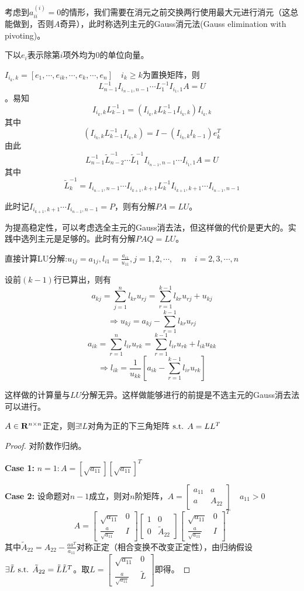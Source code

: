 \documentclass{ctexart}
\begin{document}
考虑到$a_{ii}^{(i)}=0$的情形，我们需要在消元之前交换两行使用最大元进行消元（这总能做到，否则$A$奇异），此时称选列主元的Gauss消元法(Gauss elimination with pivoting)。

下以$e_i$表示除第$i$项外均为0的单位向量。

$I_{i_k,k}=[e_1,\cdots, e_{ik},\cdots ,e_k,\cdots, e_n]\quad i_k\geq k$为置换矩阵，则\[L_{n-1}^{-1}I_{i_{n-1},n-1}\cdots L_1^{-1}I_{i_1,1}A=U\]。易知\[I_{i_k,k}L^{-1}_{k-1}=(I_{i_k,k}L_{k-1}^{-1}I_{i_k,k})I_{i_k,k}\]其中\[(I_{i_k,k}L_{k-1}^{-1}I_{i_k,k})=I-(I_{i_k,k}l_{k-1})e_k^T\]由此\[L^{-1}_{n-1}\tilde{L}^{-1}_{n-2}\cdots \tilde{L}^{-1}_1I_{i_{n-1},n-1}\cdots I_{i_1,1}A=U\]其中\[\tilde{L}^{-1}_{k}=I_{i_{n-1},n-1}\cdots I_{i_{k+1},k+1}L_k^{-1} I_{i_{k+1},k+1}\cdots I_{i_{n-1},n-1}\]

此时记$I_{i_{k+1},k+1}\cdots I_{i_{n-1},n-1}=P$，则有分解$PA=LU$。

为提高稳定性，可以考虑选全主元的Gauss消去法，但这样做的代价是更大的。实践中选列主元是足够的。此时有分解$PAQ=LU$。

直接计算LU分解:$u_{1j}=a_{1j},l_{i1}=\frac{a_{i1}}{u_{11}},j=1,2,\cdots,\quad n\quad i=2,3,\cdots,n$

设前$(k-1)$行已算出，则有
\[a_{kj}=\sum_{j=1}^n l_{kr}u_{rj}=\sum_{r=1}^{k-1}l_{kr}u_{rj}+u_{kj}\]
\[\Rightarrow u_{kj}=a_{kj}-\sum_{r=1}^{k-1}l_{kr}u_{rj}\]
\[a_{ik}=\sum_{r=1}^n l_{ir}u_{rk}=\sum_{r=1}^{k-1}l_{ir}u_{rk}+l_{ik}u_{kk}\]
\[\Rightarrow l_{ik}=\frac{1}{u_{kk}}[a_{ik}-\sum_{r=1}^{k-1}l_{ir}u_{rk}]\]

这样做的计算量与$LU$分解无异。这样做能够进行的前提是不选主元的Gauss消去法可以进行。

\begin{Thm}[Cholesky分解]
$A\in\mathbf{R}^{n\times n}$正定，则$\exists !L$对角为正的下三角矩阵$\text{ s.t. } A=LL^T$
\end{Thm}
\begin{proof}
对阶数作归纳。

\textbf{Case 1: }$ n=1:A=[\sqrt{a_{11}}][\sqrt{a_{11}}]^T$

\textbf{Case 2: }设命题对$n-1$成立，则对$n$阶矩阵，$A=\begin{bmatrix}a_{11}& a\\ a&A_{22}\end{bmatrix}\quad a_{11}>0$
\[A=\begin{bmatrix}\sqrt{a_{11}}&0\\\frac{a}{\sqrt{a_{11}}}& I\end{bmatrix}\begin{bmatrix}1&0\\ 0&\tilde{A}_{22}\end{bmatrix}\begin{bmatrix}\sqrt{a_{11}}&0\\\frac{a}{\sqrt{a_{11}}}& I\end{bmatrix}^T\]
其中$\tilde{A}_{22}=A_{22}-\frac{aa^T}{a_{11}}$对称正定（相合变换不改变正定性），由归纳假设$\exists \tilde{L}\text{ s.t. } \tilde{A}_{22}=\tilde{L}\tilde{L}^T$。取$L=\begin{bmatrix}\sqrt{a_{11}}&0\\ \frac{a}{\sqrt{a_{11}}}&\tilde{L}\end{bmatrix}$即得。
\end{proof}
\end{document}
